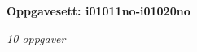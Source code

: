 \centerline{\bf Oppgavesett: i01011no-i01020no}
\vskip 10pt
\centerline{\it 10 oppgaver}\vskip 10pt
\vskip 10pt
